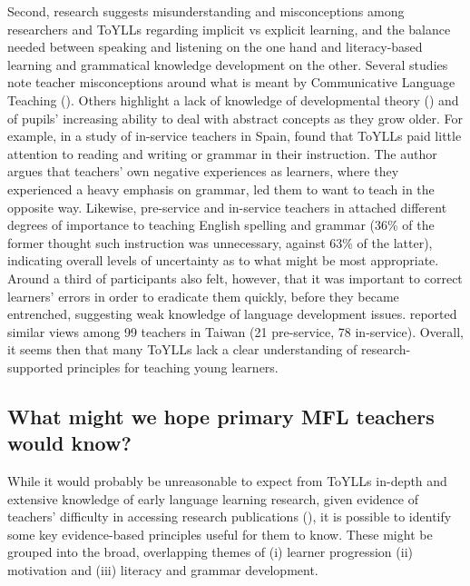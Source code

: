 \documentclass[output=paper]{langscibook}
\begin{document}
\begin{sloppypar}
Second, research suggests misunderstanding and misconceptions among researchers and ToYLLs regarding implicit vs explicit learning, and the balance needed between speaking and listening on the one hand and literacy-based learning and grammatical knowledge development on the other. Several studies note teacher misconceptions around what is meant by Communicative Language Teaching (\citealt{Butler2005,GartonEtAl2011}). Others highlight a lack of knowledge of developmental theory (\citealt{Hild2017,Rea-DickinsGardner2000}) and of pupils’ increasing ability to deal with abstract concepts as they grow older. For example, in a study of in-service teachers in Spain, \citet{Roothoft2017} found that ToYLLs paid little attention to reading and writing or grammar in their instruction. The author argues that teachers’ own negative experiences as learners, where they experienced a heavy emphasis on grammar, led them to want to teach in the opposite way. Likewise, pre-service and in-service teachers in \citet{KocamanCansiz2012} attached different degrees of importance to teaching English spelling and grammar (36\% of the former thought such instruction was unnecessary, against 63\% of the latter), indicating overall levels of uncertainty as to what might be most appropriate. Around a third of  participants also felt, however, that it was important to correct learners’ errors in order to eradicate them quickly, before they became entrenched, suggesting weak knowledge of language development issues. \citet{Liao2007} reported similar views among 99 teachers in Taiwan (21 pre-service, 78 in-service). Overall, it seems then that many ToYLLs lack a clear understanding of research-supported principles for teaching young learners.
\end{sloppypar}

\subsection{What might we hope primary MFL teachers would know?}\label{sec:porter:1.1}

While it would probably be unreasonable to expect from ToYLLs in-depth and extensive knowledge of early language learning research, given evidence of teachers’ difficulty in accessing research publications (\citealt{MarsdenKasprowicz2017}), it is possible to identify some key evidence-based principles useful for them to know. These might be grouped into the broad, overlapping themes of (i) learner progression (ii) motivation and (iii) literacy and grammar development.
\end{document}
